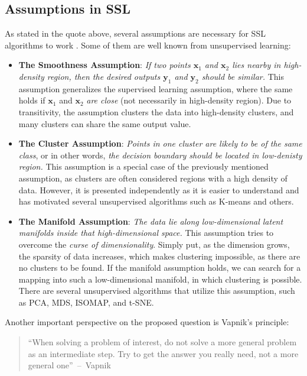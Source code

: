 \subsection{Assumptions in SSL}
As stated in the quote above, several assumptions are necessary for SSL algorithms to work \cite[p. 5]{ssl-book-2006}. 
Some of them are well known from unsupervised learning:
\begin{itemize}
    \item \textbf{The Smoothness Assumption}: \textit{If two points $\mathbf{x}_1$ and $\mathbf{x}_2$ lies nearby in high-density region, 
    then the desired outputs $\mathbf{y}_1$ and $\mathbf{y}_2$ should be similar.} This assumption generalizes the supervised learning assumption,
    where the same holds if $\mathbf{x}_1$ and $\mathbf{x}_2$ \textit{are close} (not necessarily in high-density region). Due to transitivity, 
    the assumption clusters the data into high-density clusters, and many clusters can share the same output value.
    \item \textbf{The Cluster Assumption}: \textit{Points in one cluster are likely to be of the same class}, or in other words, \textit{the decision 
    boundary should be located in low-denisty region.} This assumption is a special case of the previously mentioned assumption, as clusters are often 
    considered regions with a high density of data. However, it is presented independently as it is easier to understand and has motivated several 
    unsupervised algorithms such as K-means and others. %
    \item \textbf{The Manifold Assumption}: \textit{The data lie along low-dimensional latent manifolds inside that high-dimensional space.} This
    assumption tries to overcome the \textit{curse of dimensionality}. Simply put, as the dimension grows, the sparsity of data increases, which makes 
    clustering impossible, as there are no clusters to be found. If the manifold assumption holds, we can search for a mapping into such a 
    low-dimensional manifold, in which clustering is possible. There are several unsupervised algorithms that utilize this assumption, such as PCA, 
    MDS, ISOMAP, and t-SNE.
\end{itemize}

Another important perspective on the proposed question is Vapnik's principle\cite[p. 7]{ssl-book-2006}:

\begin{quote}
    ``When solving a problem of interest, do not solve a more general problem as an intermediate step. 
    Try to get the answer you really need, not a more general one''~--~Vapnik \cite{vapnik-quote-2006}
\end{quote}

